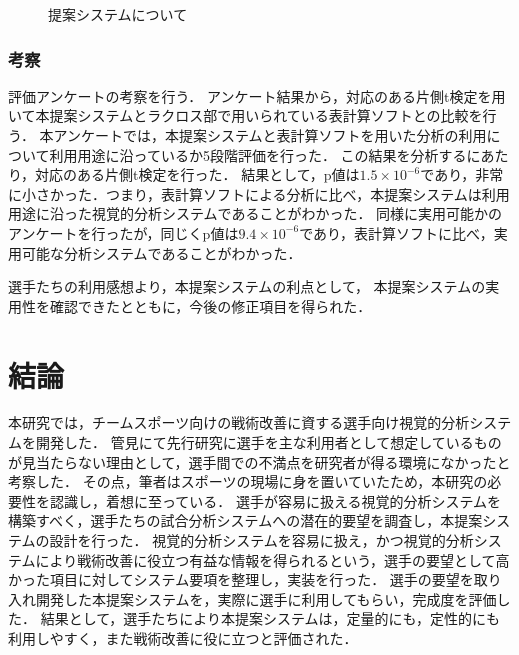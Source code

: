 \documentclass[sotsuron]{kuee}
\begin{document}
			\begin{figure}
				\begin{center}
				\end{center}
				\caption{提案システムについて}
		  		\label{fig:result08}
			\end{figure}
		\subsection{考察}
			評価アンケートの考察を行う．
			アンケート結果から，対応のある片側t検定を用いて本提案システムとラクロス部で用いられている表計算ソフトとの比較を行う．
			本アンケートでは，本提案システムと表計算ソフトを用いた分析の利用について利用用途に沿っているか5段階評価を行った．
			この結果を分析するにあたり，対応のある片側t検定を行った．
			結果として，p値は$1.5 \times 10^{-6}$であり，非常に小さかった．つまり，表計算ソフトによる分析に比べ，本提案システムは利用用途に沿った視覚的分析システムであることがわかった．
			同様に実用可能かのアンケートを行ったが，同じくp値は$9.4 \times 10^{-6}$であり，表計算ソフトに比べ，実用可能な分析システムであることがわかった．

			選手たちの利用感想より，本提案システムの利点として，	
			本提案システムの実用性を確認できたとともに，今後の修正項目を得られた．

\chapter{結論}
	本研究では，チームスポーツ向けの戦術改善に資する選手向け視覚的分析システムを開発した．
	管見にて先行研究に選手を主な利用者として想定しているものが見当たらない理由として，選手間での不満点を研究者が得る環境になかったと考察した．
	その点，筆者はスポーツの現場に身を置いていたため，本研究の必要性を認識し，着想に至っている．
	選手が容易に扱える視覚的分析システムを構築すべく，選手たちの試合分析システムへの潜在的要望を調査し，本提案システムの設計を行った．
	視覚的分析システムを容易に扱え，かつ視覚的分析システムにより戦術改善に役立つ有益な情報を得られるという，選手の要望として高かった項目に対してシステム要項を整理し，実装を行った．
	選手の要望を取り入れ開発した本提案システムを，実際に選手に利用してもらい，完成度を評価した．
	結果として，選手たちにより本提案システムは，定量的にも，定性的にも利用しやすく，また戦術改善に役に立つと評価された．
\end{document}
